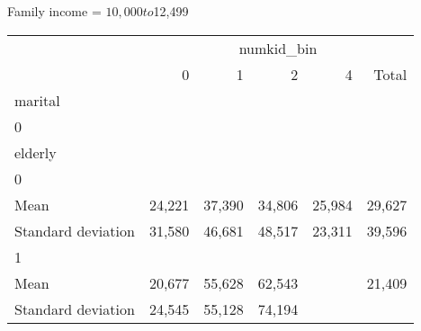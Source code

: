 Family income = $10,000 to $12,499
\begin{tabular}{llllll}
\cline{1-6}
\multicolumn{1}{c}{} &
  \multicolumn{5}{|c}{numkid\_bin} \\
\multicolumn{1}{c}{} &
  \multicolumn{1}{|r}{0} &
  \multicolumn{1}{r}{1} &
  \multicolumn{1}{r}{2} &
  \multicolumn{1}{r}{4} &
  \multicolumn{1}{r}{Total} \\
\cline{1-6}
\multicolumn{1}{l}{marital} &
  \multicolumn{1}{|r}{} &
  \multicolumn{1}{r}{} &
  \multicolumn{1}{r}{} &
  \multicolumn{1}{r}{} &
  \multicolumn{1}{r}{} \\
\multicolumn{1}{l}{\hspace{1em}0} &
  \multicolumn{1}{|r}{} &
  \multicolumn{1}{r}{} &
  \multicolumn{1}{r}{} &
  \multicolumn{1}{r}{} &
  \multicolumn{1}{r}{} \\
\multicolumn{1}{l}{\hspace{2em}elderly} &
  \multicolumn{1}{|r}{} &
  \multicolumn{1}{r}{} &
  \multicolumn{1}{r}{} &
  \multicolumn{1}{r}{} &
  \multicolumn{1}{r}{} \\
\multicolumn{1}{l}{\hspace{3em}0} &
  \multicolumn{1}{|r}{} &
  \multicolumn{1}{r}{} &
  \multicolumn{1}{r}{} &
  \multicolumn{1}{r}{} &
  \multicolumn{1}{r}{} \\
\multicolumn{1}{l}{\hspace{4em}Mean} &
  \multicolumn{1}{|r}{24,221} &
  \multicolumn{1}{r}{37,390} &
  \multicolumn{1}{r}{34,806} &
  \multicolumn{1}{r}{25,984} &
  \multicolumn{1}{r}{29,627} \\
\multicolumn{1}{l}{\hspace{4em}Standard deviation} &
  \multicolumn{1}{|r}{31,580} &
  \multicolumn{1}{r}{46,681} &
  \multicolumn{1}{r}{48,517} &
  \multicolumn{1}{r}{23,311} &
  \multicolumn{1}{r}{39,596} \\
\multicolumn{1}{l}{\hspace{3em}1} &
  \multicolumn{1}{|r}{} &
  \multicolumn{1}{r}{} &
  \multicolumn{1}{r}{} &
  \multicolumn{1}{r}{} &
  \multicolumn{1}{r}{} \\
\multicolumn{1}{l}{\hspace{4em}Mean} &
  \multicolumn{1}{|r}{20,677} &
  \multicolumn{1}{r}{55,628} &
  \multicolumn{1}{r}{62,543} &
  \multicolumn{1}{r}{} &
  \multicolumn{1}{r}{21,409} \\
\multicolumn{1}{l}{\hspace{4em}Standard deviation} &
  \multicolumn{1}{|r}{24,545} &
  \multicolumn{1}{r}{55,128} &
  \multicolumn{1}{r}{74,194} &

\end{tabular}
